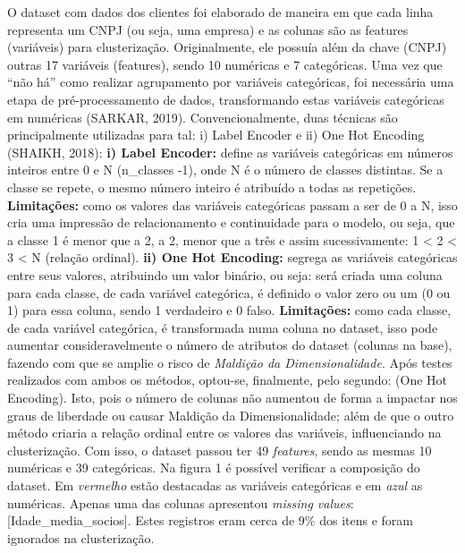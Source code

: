 \documentclass[twocolumn]{rbef}
\newcommand{\1}{\mathbbm{1}}
\begin{document}
O dataset com dados dos clientes foi elaborado de maneira em que cada linha representa um CNPJ (ou seja, uma empresa) e as colunas são as features (variáveis) para clusterização. Originalmente, ele possuía além da chave (CNPJ) outras 17 variáveis (features), sendo 10 numéricas e 7 categóricas. Uma vez que “não há” como realizar agrupamento por variáveis categóricas, foi necessária uma etapa de pré-processamento de dados, transformando estas variáveis categóricas em numéricas (SARKAR, 2019)\cite{SARKAR}. Convencionalmente, duas técnicas são principalmente utilizadas para tal: i) Label Encoder e ii) One Hot Encoding (SHAIKH, 2018)\cite{SHAIKH}:
\newline\linebreak\textbf{i) Label Encoder:} define as variáveis categóricas em números inteiros entre 0 e N (n\_classes -1), onde N é o número de classes distintas. Se a classe se repete, o mesmo número inteiro é atribuído a todas as repetições. \textbf{Limitações:} como os valores das variáveis categóricas passam a ser de 0 a N, isso cria uma impressão de relacionamento e continuidade para o modelo, ou seja, que a classe 1 é menor que a 2, a 2, menor que a três e assim sucessivamente: 1 < 2 < 3 < N (relação ordinal).
\linebreak\textbf{ii) One Hot Encoding:} segrega as variáveis categóricas entre seus valores, atribuindo um valor binário, ou seja: será criada uma coluna para cada classe, de cada variável categórica, é definido o valor zero ou um (0 ou 1) para essa coluna, sendo 1 verdadeiro e 0 falso. \textbf{Limitações:} como cada classe, de cada variável categórica, é transformada numa coluna no dataset, isso pode aumentar consideravelmente o número de atributos do dataset (colunas na base), fazendo com que se amplie o risco de \emph{Maldição da Dimensionalidade}.
\newline\linebreak Após testes realizados com ambos os métodos, optou-se, finalmente, pelo segundo: (One Hot Encoding). Isto, pois o número de colunas não aumentou de forma a impactar nos graus de liberdade ou causar Maldição da Dimensionalidade; além de que o outro método criaria a relação ordinal entre os valores das variáveis, influenciando na clusterização. Com isso, o dataset passou ter 49 \emph{features}, sendo as mesmas 10 numéricas e 39 categóricas. Na figura 1 é possível verificar a composição do dataset. Em \emph{vermelho} estão destacadas as variáveis categóricas e em \emph{azul} as numéricas. Apenas uma das colunas apresentou \emph{missing values}: [Idade\_media\_socios]. Estes registros eram cerca de 9\% dos itens e foram ignorados na clusterização.
\end{document}
